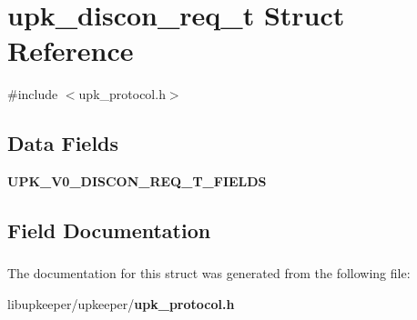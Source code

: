 \section{upk\_\-discon\_\-req\_\-t Struct Reference}
\label{structupk__discon__req__t}


{\ttfamily \#include $<$upk\_\-protocol.h$>$}

\subsection*{Data Fields}
\begin{DoxyCompactItemize}
\item 
{\bf UPK\_\-V0\_\-DISCON\_\-REQ\_\-T\_\-FIELDS}
\end{DoxyCompactItemize}


\subsection{Field Documentation}
\subsubsection[{UPK\_\-V0\_\-DISCON\_\-REQ\_\-T\_\-FIELDS}]{}\label{structupk__discon__req__t_a4abf17c2531d95eb487723684eb92352}


The documentation for this struct was generated from the following file:\begin{DoxyCompactItemize}
\item 
libupkeeper/upkeeper/{\bf upk\_\-protocol.h}\end{DoxyCompactItemize}
